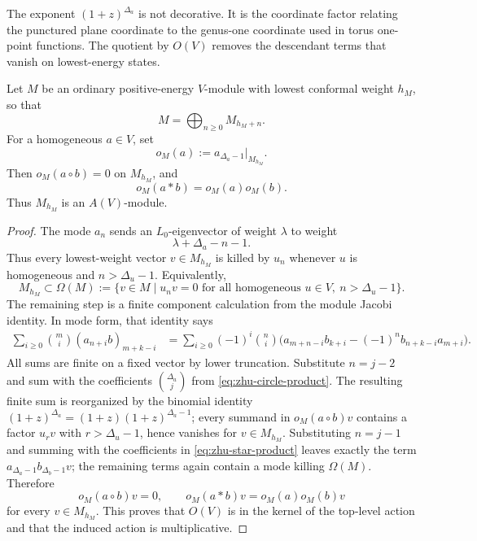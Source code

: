 The exponent \((1+z)^{\Delta_a}\) is not decorative.  It is the coordinate
factor relating the punctured plane coordinate to the genus-one coordinate
used in torus one-point functions.  The quotient by \(O(V)\) removes the
descendant terms that vanish on lowest-energy states.

\begin{proposition}
\label{prop:zhu-top-level-action}
Let \(M\) be an ordinary positive-energy \(V\)-module with lowest conformal
weight \(h_M\), so that
\[
  M=\bigoplus_{n\ge0}M_{h_M+n}.
\]
For a homogeneous \(a\in V\), set
\begin{equation}
  o_M(a):=a_{\Delta_a-1}\big|_{M_{h_M}} .
  \label{eq:zhu-zero-mode-action}
\end{equation}
Then \(o_M(a\circ b)=0\) on \(M_{h_M}\), and
\begin{equation}
  o_M(a*b)=o_M(a)o_M(b).
  \label{eq:zhu-top-product}
\end{equation}
Thus \(M_{h_M}\) is an \(A(V)\)-module.
\end{proposition}

\begin{proof}
The mode \(a_n\) sends an \(L_0\)-eigenvector of weight \(\lambda\) to weight
\begin{equation}
  \lambda+\Delta_a-n-1.
  \label{eq:voa-mode-weight-shift}
\end{equation}
Thus every lowest-weight vector \(v\in M_{h_M}\) is killed by \(u_n\) whenever
\(u\) is homogeneous and \(n>\Delta_u-1\).  Equivalently,
\begin{equation}
  M_{h_M}\subset
  \Omega(M):=\{v\in M\mid u_n v=0
  \text{ for all homogeneous }u\in V,\ n>\Delta_u-1\}.
  \label{eq:zhu-omega-subspace}
\end{equation}
The remaining step is a finite component calculation from the module Jacobi
identity.  In mode form, that identity says
\begin{align}
  \sum_{i\ge0}\binom{m}{i}(a_{n+i}b)_{m+k-i}
  &=
  \sum_{i\ge0}(-1)^i\binom{n}{i}
  \bigl(a_{m+n-i}b_{k+i}
  -(-1)^n b_{n+k-i}a_{m+i}\bigr).
  \label{eq:borcherds-component-identity}
\end{align}
All sums are finite on a fixed vector by lower truncation.  Substitute
\(n=j-2\) and sum with the coefficients
\(\binom{\Delta_a}{j}\) from \eqref{eq:zhu-circle-product}.  The resulting
finite sum is reorganized by the binomial identity
\((1+z)^{\Delta_a}=(1+z)(1+z)^{\Delta_a-1}\); every summand in
\(o_M(a\circ b)v\) contains a factor \(u_rv\) with \(r>\Delta_u-1\), hence
vanishes for \(v\in M_{h_M}\).  Substituting \(n=j-1\) and summing with the
coefficients in \eqref{eq:zhu-star-product} leaves exactly the term
\(a_{\Delta_a-1}b_{\Delta_b-1}v\); the remaining terms again contain a mode
killing \(\Omega(M)\).  Therefore
\begin{equation}
  o_M(a\circ b)v=0,\qquad
  o_M(a*b)v=o_M(a)o_M(b)v
  \label{eq:zhu-top-level-identities}
\end{equation}
for every \(v\in M_{h_M}\).  This proves that \(O(V)\) is in the kernel of
the top-level action and that the induced action is multiplicative.
\end{proof}

